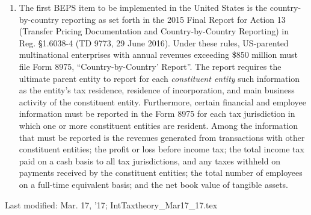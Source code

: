 \begin{enumerate}
	\item The first BEPS item to be implemented in the United States is the country-by-country reporting as set forth in the 2015 Final Report for Action 13 (Transfer Pricing Documentation and Country-by-Country Reporting) in Reg. \S1.6038-4 (TD 9773, 29 June 2016).  Under these rules, US-parented multinational enterprises with annual revenues exceeding \$850 million must file Form 8975, ``Country-by-Country' Report''.   The report requires the ultimate parent entity to report for each \emph{constituent entity} such information as the entity's tax residence, residence of incorporation, and main business activity of the constituent entity.  Furthermore, certain financial and employee information must be reported in the Form 8975 for each tax jurisdiction in which one or more constituent entities are resident.  Among the information that must be reported is the revenues generated from transactions with other constituent entities; the profit or loss before income tax; the total income tax paid on a cash basis to all tax jurisdictions, and any taxes withheld on payments received by the constituent entities; the total number of employees on a full-time equivalent basis; and the net book value of tangible assets.
	

\end{enumerate}


\begin{framed}
Last modified: Mar. 17, '17; IntTaxtheory\_Mar17\_17.tex
\end{framed}

